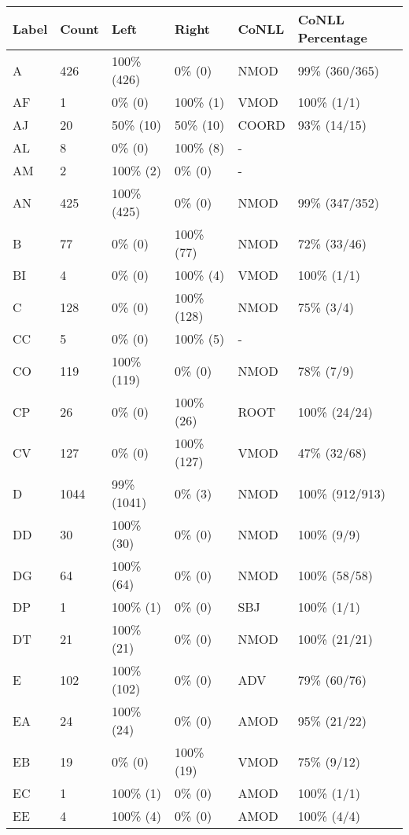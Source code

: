 \begin{figure*}
\begin{tabular}{|l|l|l|l||l|l|}
\hline
Label & Count & Left & Right & CoNLL & CoNLL Percentage\\ 
\hline
 A & 426 & 100\% (426) & 0\% (0) & NMOD & 99\% (360/365) \\ 
\hline
 AF & 1 & 0\% (0) & 100\% (1) & VMOD & 100\% (1/1) \\ 
\hline
 AJ & 20 & 50\% (10) & 50\% (10) & COORD & 93\% (14/15) \\ 
\hline
 AL & 8 & 0\% (0) & 100\% (8) & - &  \\ 
\hline
 AM & 2 & 100\% (2) & 0\% (0) & - &  \\ 
\hline
 AN & 425 & 100\% (425) & 0\% (0) & NMOD & 99\% (347/352) \\ 
\hline
 B & 77 & 0\% (0) & 100\% (77) & NMOD & 72\% (33/46) \\ 
\hline
 BI & 4 & 0\% (0) & 100\% (4) & VMOD & 100\% (1/1) \\ 
\hline
 C & 128 & 0\% (0) & 100\% (128) & NMOD & 75\% (3/4) \\ 
\hline
 CC & 5 & 0\% (0) & 100\% (5) & - &  \\ 
\hline
 CO & 119 & 100\% (119) & 0\% (0) & NMOD & 78\% (7/9) \\ 
\hline
 CP & 26 & 0\% (0) & 100\% (26) & ROOT & 100\% (24/24) \\ 
\hline
 CV & 127 & 0\% (0) & 100\% (127) & VMOD & 47\% (32/68) \\ 
\hline
 D & 1044 & 99\% (1041) & 0\% (3) & NMOD & 100\% (912/913) \\ 
\hline
 DD & 30 & 100\% (30) & 0\% (0) & NMOD & 100\% (9/9) \\ 
\hline
 DG & 64 & 100\% (64) & 0\% (0) & NMOD & 100\% (58/58) \\ 
\hline
 DP & 1 & 100\% (1) & 0\% (0) & SBJ & 100\% (1/1) \\ 
\hline
 DT & 21 & 100\% (21) & 0\% (0) & NMOD & 100\% (21/21) \\ 
\hline
 E & 102 & 100\% (102) & 0\% (0) & ADV & 79\% (60/76) \\ 
\hline
 EA & 24 & 100\% (24) & 0\% (0) & AMOD & 95\% (21/22) \\ 
\hline
 EB & 19 & 0\% (0) & 100\% (19) & VMOD & 75\% (9/12) \\ 
\hline
 EC & 1 & 100\% (1) & 0\% (0) & AMOD & 100\% (1/1) \\ 
\hline
 EE & 4 & 100\% (4) & 0\% (0) & AMOD & 100\% (4/4) \\ 
\hline

\end{tabular}
\end{figure*}
